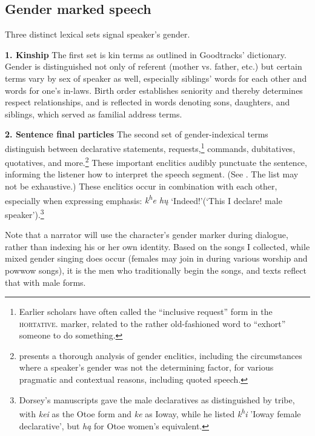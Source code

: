 \documentclass[output=paper]{LSP/langsci}
\begin{document}
\subsection{Gender marked speech} Three distinct lexical sets signal speaker's gender.  

\textbf{1.  Kinship}  The first set is kin terms as outlined in Goodtracks' dictionary. Gender is distinguished not only of referent (mother vs. father, etc.) but certain terms vary by sex of speaker as well, especially siblings' words for each other and words for one's in-laws.  Birth order establishes seniority and thereby determines respect relationships, and is reflected in words denoting sons, daughters, and siblings, which served as familial address terms.

\textbf{2. Sentence final particles} The second set of gender-indexical terms distinguish between declarative statements, requests,\footnote{Earlier scholars have often called the ``inclusive request'' form in  the \textsc{hortative.} marker, related to the rather old-fashioned word to ``exhort'' someone to do something.}  commands, dubitatives, quotatives, and more.\footnote{\citet{Trechter1993} presents a thorough analysis of gender enclitics, including the circumstances where a speaker's gender was not the determining factor, for various pragmatic and contextual reasons, including quoted speech.} These important enclitics audibly punctuate the sentence, informing the listener how to interpret the speech segment.   (See . The list may not be exhaustive.) These enclitics occur in combination with each other, especially when expressing emphasis: \textit{k\textsuperscript{h}e h\k{u}} `Indeed!'(`This I declare! male speaker').\footnote{Dorsey's manuscripts gave the male declaratives as distinguished by tribe, with \textit{kei} as the Otoe form and \textit{ke} as Ioway, while he listed \textit{k\textsuperscript{h}i} 'Ioway female declarative', but \textit{h\k{a}} for Otoe women's equivalent.} 

Note that a narrator will use the character's gender marker during dialogue, rather than indexing his or her own identity. Based on the songs I collected, while mixed gender singing does occur (females may join in during various worship and powwow songs), it is the men who traditionally begin the songs, and texts reflect that with male forms.  
\end{document}
